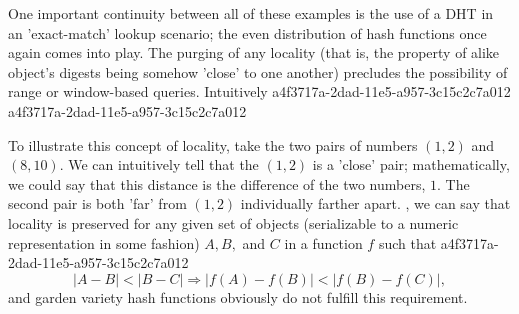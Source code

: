 \documentclass[12pt]{article}
\begin{document}
\par One important continuity between all of these examples is the use of a DHT in an 'exact-match' lookup scenario; the even distribution of hash functions once again comes into play. The purging of any locality (that is, the property of alike object's digests being somehow 'close' to one another) precludes the possibility of range or window-based queries. Intuitively
a4f3717a-2dad-11e5-a957-3c15c2c7a012
a4f3717a-2dad-11e5-a957-3c15c2c7a012\par To illustrate this concept of locality, take the two pairs of numbers $(1,2)$ and $(8,10)$. We can intuitively tell that the $(1,2)$ is a 'close' pair; mathematically, we could say that this distance is the difference of the two numbers, $1$. The second pair is both 'far' from $(1,2)$ individually farther apart. , we can say that locality is preserved for any given set of objects (serializable to a numeric representation in some fashion) $A,B,$ and $C$ in a function $f$ such that
a4f3717a-2dad-11e5-a957-3c15c2c7a012\begin{equation}
|A-B| < |B-C| \Rightarrow |f(A)-f(B)| < |f(B) - f(C)|,
\end{equation}
and garden variety hash functions obviously do not fulfill this requirement.

\printbibliography
\end{document}
